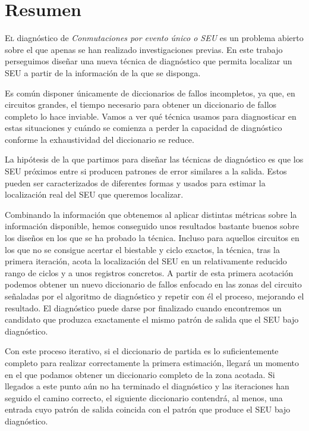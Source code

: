\chapter*{Resumen}
\pagestyle{especial}
{}

\lettrine[lraise=-0.1, lines=2, loversize=0.2]{E}{l} diagnóstico de
\textit{Conmutaciones por evento único o \gls{SEU}} es un problema abierto sobre 
el que apenas se han realizado investigaciones previas. En este trabajo 
perseguimos diseñar una nueva técnica de diagnóstico que permita localizar un 
\gls{SEU} a partir de la información de la que se disponga.

Es común disponer únicamente de diccionarios de fallos incompletos, ya que, en
circuitos grandes, el tiempo necesario para obtener un diccionario de fallos
completo lo hace inviable. Vamos a ver qué técnica usamos para diagnosticar en
estas situaciones y cuándo se comienza a perder la capacidad de diagnóstico
conforme la exhaustividad del diccionario se reduce.

La hipótesis de la que partimos para diseñar las técnicas de diagnóstico es que
los \gls{SEU} próximos entre si producen patrones de error similares a la salida. 
Estos pueden ser caracterizados de diferentes formas y usados para estimar la
localización real del \gls{SEU} que queremos localizar.

Combinando la información que obtenemos al aplicar distintas métricas sobre la
información disponible, hemos conseguido unos resultados bastante buenos sobre los
diseños en los que se ha probado la técnica. Incluso para aquellos circuitos en
los que no se consigue acertar el biestable y ciclo exactos, la técnica, tras la
primera iteración, acota la localización del \gls{SEU} en un relativamente 
reducido rango de ciclos y a unos registros concretos. A partir de esta primera
acotación podemos obtener un nuevo diccionario de fallos enfocado en las zonas del
circuito señaladas por el algoritmo de diagnóstico y repetir con él el proceso,
mejorando el resultado. El diagnóstico puede darse por finalizado cuando
encontremos un candidato que produzca exactamente el mismo patrón de salida que
el \gls{SEU} bajo diagnóstico.

Con este proceso iterativo, si el diccionario de partida es lo suficientemente
completo para realizar correctamente la primera estimación, llegará un momento en
el que podamos obtener un diccionario completo de la zona acotada. Si llegados a
este punto aún no ha terminado el diagnóstico y las iteraciones han seguido el 
camino correcto, el siguiente diccionario contendrá, al menos, una entrada cuyo 
patrón de salida coincida con el patrón que produce el \gls{SEU} bajo diagnóstico.

